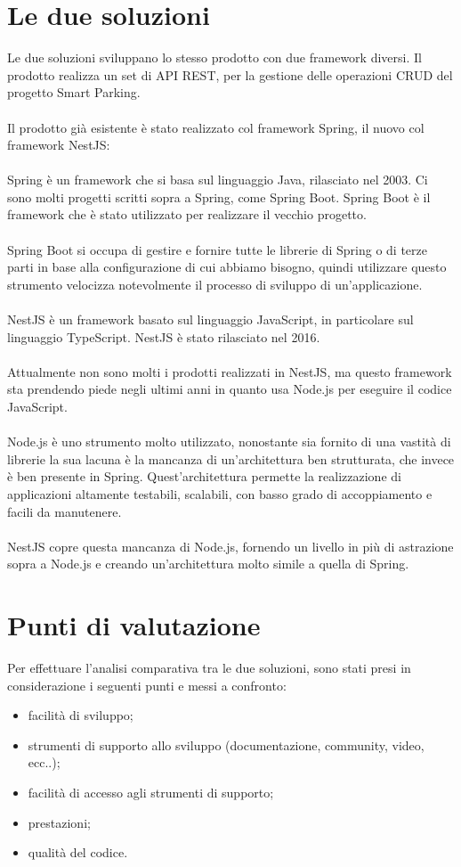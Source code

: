 \section{Le due soluzioni}
Le due soluzioni sviluppano lo stesso prodotto con due framework diversi.
Il prodotto realizza un set di \gls{API} \gls{REST}, per la gestione delle operazioni \gls{CRUD} del
progetto Smart Parking.
\\\\
Il prodotto già esistente è stato realizzato col framework Spring, il nuovo col framework NestJS:
\\\\
Spring è un framework che si basa sul linguaggio Java, rilasciato nel 2003. Ci sono molti progetti scritti
sopra a Spring, come Spring Boot. Spring Boot è il framework che è stato utilizzato per realizzare il vecchio progetto.
\\\\
Spring Boot si occupa di gestire
e fornire tutte le librerie di Spring o di terze parti in base alla configurazione di cui abbiamo bisogno, quindi 
utilizzare questo strumento velocizza notevolmente il processo di sviluppo di un'applicazione.
\\\\
NestJS è un framework basato sul linguaggio JavaScript, in particolare sul linguaggio TypeScript. NestJS è
stato rilasciato nel 2016.
\\\\
Attualmente non sono molti i prodotti realizzati in NestJS, ma questo framework sta prendendo piede negli ultimi anni in quanto
usa Node.js per eseguire il codice JavaScript.
\\\\
Node.js è uno strumento molto utilizzato, nonostante sia fornito di una vastità di librerie la sua lacuna è la mancanza
di un'architettura ben strutturata, che invece è ben presente in Spring. Quest'architettura 
permette la realizzazione di applicazioni altamente testabili, scalabili, con basso grado di accoppiamento
e facili da manutenere.
\\\\
NestJS copre questa mancanza di Node.js, fornendo un livello in più di astrazione sopra a Node.js e creando un'architettura 
molto simile a quella di Spring.

\section{Punti di valutazione}
Per effettuare l'analisi comparativa tra le due soluzioni, sono stati presi in considerazione i seguenti 
punti e messi a confronto:
\begin{itemize}
    \item facilità di sviluppo;
    \item strumenti di supporto allo sviluppo (documentazione, community, video, ecc..);
    \item facilità di accesso agli strumenti di supporto;
    \item prestazioni;
    \item qualità del codice.
\end{itemize}

